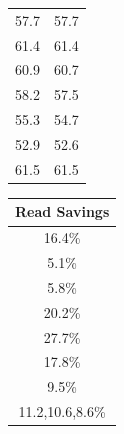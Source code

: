 \begin{table}[t]
\begin{tabular}{|c|c|}
    57.7 & 57.7 \\ 
    61.4 & 61.4 \\ 
    60.9 & {\color{red} 60.7} \\ 
    58.2 & {\color{red} 57.5} \\ 
    55.3 & {\color{red} 54.7} \\ 
    52.9 & {\color{red} 52.6} \\
    61.5 & 61.5 \\ 
    \end{tabular}
    \begin{tabular}{|c}
    \\
    Read Savings \\
    \hline
    16.4\%\\ 
    5.1\%\\ 
    5.8\%\\ 
    20.2\%\\ 
    27.7\%\\ 
    17.8\%\\ 
    9.5\% \\
    11.2,10.6,8.6\%\\ 
    \end{tabular}


\end{table}
